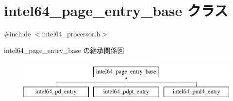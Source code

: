 \hypertarget{classintel64__page__entry__base}{}\section{intel64\+\_\+page\+\_\+entry\+\_\+base クラス}
\label{classintel64__page__entry__base}


{\ttfamily \#include $<$intel64\+\_\+processor.\+h$>$}

intel64\+\_\+page\+\_\+entry\+\_\+base の継承関係図\begin{figure}[H]
\begin{center}
\leavevmode
\includegraphics[height=2.000000cm]{classintel64__page__entry__base}
\end{center}
\end{figure}
